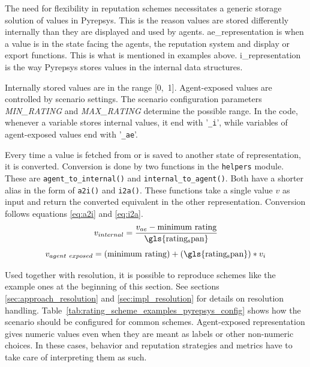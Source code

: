 \documentclass[%
    ]{\PathToTumTemplate/thesis/tum_thesis}
\begin{document}
The need for flexibility in reputation schemes necessitates a generic storage solution of values in Pyrepsys.
This is the reason values are stored differently internally than they are displayed and used by agents.
\Gls{ae_representation} is when a value is in the state facing the agents, the reputation system and display or export functions.
This is what is mentioned in examples above.
\Gls{i_representation} is the way Pyrepsys stores values in the internal data structures.

Internally stored values are in the range [0,~1].
Agent-exposed values are controlled by scenario settings.
The scenario configuration parameters \emph{MIN\_RATING} and \emph{MAX\_RATING} determine the possible range.
In the code, whenever a variable stores internal values, it end with '\texttt{\_i}', while variables of agent-exposed values end with '\texttt{\_ae}'.

Every time a value is fetched from or is saved to another state of representation, it is converted.
Conversion is done by two functions in the \texttt{helpers} module. 
These are \lstinline{agent_to_internal()} and \lstinline{internal_to_agent()}.
Both have a shorter alias in the form of \lstinline{a2i()} and \lstinline{i2a()}.
These functions take a single value $v$ as input and return the converted equivalent in the other representation. 
Conversion follows equations \ref{eq:a2i} and \ref{eq:i2a}.
\begin{equation}\label{eq:a2i}
v_{internal} = \frac{v_{ae} - \mathrm{minimum~rating}}{\mathrm{\gls{rating_span}}}
\end{equation}
\begin{equation}\label{eq:i2a}
v_{agent~exposed} = (\mathrm{minimum~rating}) + (\mathrm{\gls{rating_span}}) * v_{i}
\end{equation}

Used together with resolution, it is possible to reproduce schemes like the example ones at the beginning of this section.
See sections \ref{sec:approach_resolution} and \ref{sec:impl_resolution} for details on resolution handling.
Table~\ref{tab:rating_scheme_examples_pyrepsys_config} shows how the scenario should be configured for common schemes.
Agent-exposed representation gives numeric values even when they are meant as labels or other non-numeric choices.
In these cases, behavior and reputation strategies and metrics have to take care of interpreting them as such.
\end{document}
